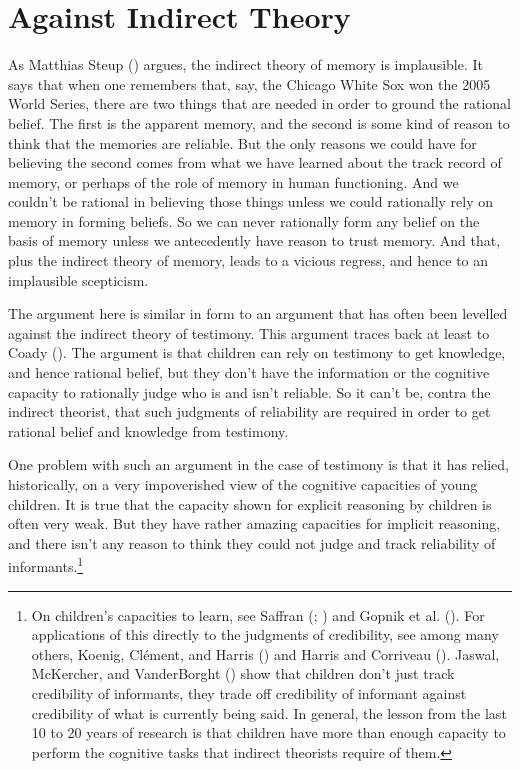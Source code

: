 \documentclass[
  11pt,
  letterpaper,
  DIV=11,
  numbers=noendperiod,
  twoside]{scrartcl}
\begin{document}
\section{Against Indirect Theory}\label{againstindirecttheory}

As Matthias Steup () argues, the indirect
theory of memory is implausible. It says that when one remembers that,
say, the Chicago White Sox won the 2005 World Series, there are two
things that are needed in order to ground the rational belief. The first
is the apparent memory, and the second is some kind of reason to think
that the memories are reliable. But the only reasons we could have for
believing the second comes from what we have learned about the track
record of memory, or perhaps of the role of memory in human functioning.
And we couldn't be rational in believing those things unless we could
rationally rely on memory in forming beliefs. So we can never rationally
form any belief on the basis of memory unless we antecedently have
reason to trust memory. And that, plus the indirect theory of memory,
leads to a vicious regress, and hence to an implausible scepticism.

The argument here is similar in form to an argument that has often been
levelled against the indirect theory of testimony. This argument traces
back at least to Coady (). The argument is
that children can rely on testimony to get knowledge, and hence rational
belief, but they don't have the information or the cognitive capacity to
rationally judge who is and isn't reliable. So it can't be, contra the
indirect theorist, that such judgments of reliability are required in
order to get rational belief and knowledge from testimony.

One problem with such an argument in the case of testimony is that it
has relied, historically, on a very impoverished view of the cognitive
capacities of young children. It is true that the capacity shown for
explicit reasoning by children is often very weak. But they have rather
amazing capacities for implicit reasoning, and there isn't any reason to
think they could not judge and track reliability of
informants.\footnote{On children's capacities to learn, see Saffran
  (; )
  and Gopnik et al. (). For applications
  of this directly to the judgments of credibility, see among many
  others, Koenig, Clément, and Harris
  () and Harris and
  Corriveau (). Jaswal,
  McKercher, and VanderBorght () show
  that children don't just track credibility of informants, they trade
  off credibility of informant against credibility of what is currently
  being said. In general, the lesson from the last 10 to 20 years of
  research is that children have more than enough capacity to perform
  the cognitive tasks that indirect theorists require of them.}
\end{document}
